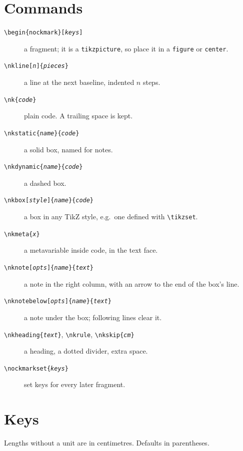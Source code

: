 \documentclass{article}
\begin{document}
\section{Commands}

\begin{description}
\item[\texttt{\textbackslash begin\{nockmark\}[\emph{keys}]}] a fragment; it is a \texttt{tikzpicture}, so place it in a \texttt{figure} or \texttt{center}.
\item[\texttt{\textbackslash nkline[\emph{n}]\{\emph{pieces}\}}] a line at the next baseline, indented $n$ steps.
\item[\texttt{\textbackslash nk\{\emph{code}\}}] plain code.  A trailing space is kept.
\item[\texttt{\textbackslash nkstatic\{\emph{name}\}\{\emph{code}\}}] a solid box, named for notes.
\item[\texttt{\textbackslash nkdynamic\{\emph{name}\}\{\emph{code}\}}] a dashed box.
\item[\texttt{\textbackslash nkbox[\emph{style}]\{\emph{name}\}\{\emph{code}\}}] a box in any TikZ style, e.g.\ one defined with \texttt{\textbackslash tikzset}.
\item[\texttt{\textbackslash nkmeta\{\emph{x}\}}] a metavariable inside code, in the text face.
\item[\texttt{\textbackslash nknote[\emph{opts}]\{\emph{name}\}\{\emph{text}\}}] a note in the right column, with an arrow to the end of the box's line.
\item[\texttt{\textbackslash nknotebelow[\emph{opts}]\{\emph{name}\}\{\emph{text}\}}] a note under the box; following lines clear it.
\item[\texttt{\textbackslash nkheading\{\emph{text}\}}, \texttt{\textbackslash nkrule}, \texttt{\textbackslash nkskip\{\emph{cm}\}}] a heading, a dotted divider, extra space.
\item[\texttt{\textbackslash nockmarkset\{\emph{keys}\}}] set keys for every later fragment.
\end{description}

\section{Keys}

Lengths without a unit are in centimetres.  Defaults in parentheses.
\end{document}
